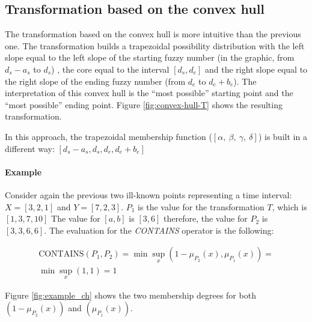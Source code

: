 \documentclass[twoside,twocolumn,a4paper]{article}
\begin{document}
\subsection{\label{subsubsec:trans-convex-hull}Transformation based on the convex hull}
The transformation based on the convex hull is more intuitive than the previous one. The transformation builds a trapezoidal possibility distribution with the left slope equal to the left slope of the starting fuzzy number (in the graphic, from $d_s-a_s$ to $d_s$) , the core equal to the interval $[d_s,d_e]$ and the right slope equal to the right slope of the ending fuzzy number (from $d_e$ to $d_e+b_e$). The interpretation of this convex hull is the ``most possible'' starting point and the ``most possible'' ending point. Figure \ref{fig:convex-hull-T} shows the resulting transformation.



In this approach, the trapezoidal membership function ($\left[\alpha,\ \beta,\ \gamma,\ \delta\right]$) is built in a different way: $\left[d_s - a_s,d_s,d_e,d_e + b_e \right]$


\paragraph{Example}
Consider again the previous two ill-known points representing a time interval:  $X = \left[3, 2, 1\right]$ and $Y = \left[7, 2, 3 \right]$.
$P_1$ is the value for the transformation $T$, which is $\left[1,3,7,10 \right]$ 
The value for $\left[a, b \right]$ is $\left[3,6 \right]$ therefore, the value for $P_2$ is $\left[3,3,6,6 \right]$. 
The evaluation for the \emph{CONTAINS} operator is the following:

\begin{eqnarray}
\nonumber
\mbox{CONTAINS}\left(P_1,P_2 \right) = \min \sup_{x} \left(1-\mu_{P_2}(x),\mu_{P_1}(x) \right) = \\
\nonumber
\min \sup_{x} \left(1,1 \right) = 1
\end{eqnarray}

Figure \ref{fig:example_ch} shows the two membership degrees for both $\left(1-\mu_{P_2}(x)\right)$ and $\left( \mu_{P_1}(x) \right)$.
\end{document}
